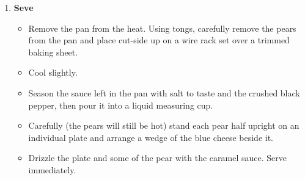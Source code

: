 \documentclass [11pt, letterpaper] {article}
\begin{document}
\begin{description}
\begin{enumerate}
	\item {\bf Seve }
	\begin{itemize}
	\item Remove the pan from the heat. Using tongs, carefully remove the pears from the pan and place cut-side up on a wire rack set over a trimmed baking sheet. 
	\item Cool slightly.
	\item Season the sauce left in the pan with salt to taste and the crushed black pepper, then pour it into a liquid measuring cup.
	\item Carefully (the pears will still be hot) stand each pear half upright on an individual plate and arrange a wedge of the blue cheese beside it.
	\item Drizzle the plate and some of the pear with the caramel sauce. Serve immediately. 
	\end{itemize}

	\end{enumerate}
\end{description}
\end{document}
